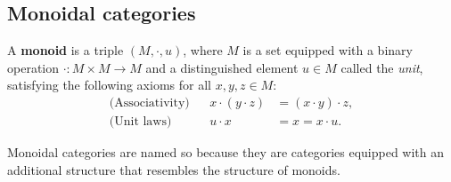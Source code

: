 

\subsection{Monoidal categories}
\begin{definition}
A \textbf{monoid} is a triple $(M, \cdot, u)$, where $M$ is a set equipped with 
a binary operation $\cdot \colon M \times M \to M$ and a distinguished element 
$u \in M$ called the \emph{unit}, satisfying the following axioms for all 
$x, y, z \in M$:
\begin{align*}
    \text{(Associativity)} & & x \cdot (y \cdot z) &= (x \cdot y) \cdot z, \\
    \text{(Unit laws)}     & & u \cdot x &= x = x \cdot u.
\end{align*}
\end{definition}

Monoidal categories are named so because they are categories equipped with an additional structure that resembles the structure of monoids.

\begin{comment}
  
\begin{definition}
 A \emph{strict monoidal category} is a category $\catC$ equipped with a bifunctor $\otimes : \catC \times \catC \to \catC$
called the \emph{tensor product}, which is associative, meaning that for all objects $A, B, C \in \catC$,
\[
A \otimes (B \otimes C) = (A \otimes B) \otimes C. 
\]
In addition, there is a distinguished object $I \in \catC$, called the \emph{unit}, that acts as a unit for $\otimes$, satisfying
\[
I \otimes C = C = C \otimes I \quad \text{for all } C \in \catC. 
\]
\end{definition}



\begin{example}
The partially ordered set of natural numbers $\mathbb{N}$ forms a strict monoidal category when equipped with addition, denoted $(\mathbb{N}, +, 0)$.  The tensor product is given by ordinary addition, and the unit object is $0$, since for any $n \in \mathbb{N}$ we have $0 + n = n = n + 0$, and addition is strictly associative.
Moreover, the tensor product is monotonic with respect to the order: if $m \leq m'$ and $n \leq n'$, then $m + n \leq m' + n'$. This order preservation ensures functoriality of the monoidal structure.
A similar argument applies to multiplication: if $m \leq m'$ and $n \leq n'$, then $m \cdot n \leq m' \cdot n'$. Therefore, $(\mathbb{N}, \cdot, 1)$ also forms a strict monoidal category under the same ordered structure.
\end{example}

\end{comment}


